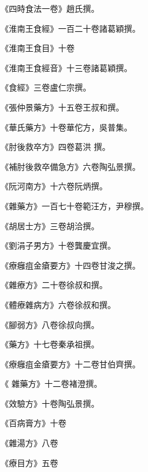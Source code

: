 \begin{pinyinscope}
 《四時食法一卷》趙氏撰。



 《淮南王食經》一百二十卷諸葛穎撰。



 《淮南王食目》十卷



 《淮南王食經音》十三卷諸葛穎撰。



 《食經》三卷盧仁宗撰。



 《張仲景藥方》十五卷王叔和撰。



 《華氏藥方》十卷華佗方，吳普集。



 《肘後救卒方》四卷葛洪
 撰。



 《補肘後救卒備急方》六卷陶弘景撰。



 《阮河南方》十六卷阮炳撰。



 《雜藥方》一百七十卷範汪方，尹穆撰。



 《胡居士方》三卷胡洽撰。



 《劉涓子男方》十卷龔慶宜撰。



 《療癰疽金瘡要方》十四卷甘浚之撰。



 《雜療方》二十卷徐叔和撰。



 《體療雜病方》六卷徐叔和撰。



 《腳弱方》八卷徐叔向撰。



 《藥方》十七卷秦承祖撰。



 《療癰疽金瘡要方》十二卷甘伯齊撰。



 《
 雜藥方》十二卷褚澄撰。



 《效驗方》十卷陶弘景撰。



 《百病膏方》十卷



 《雜湯方》八卷



 《療目方》五卷




\end{pinyinscope}
